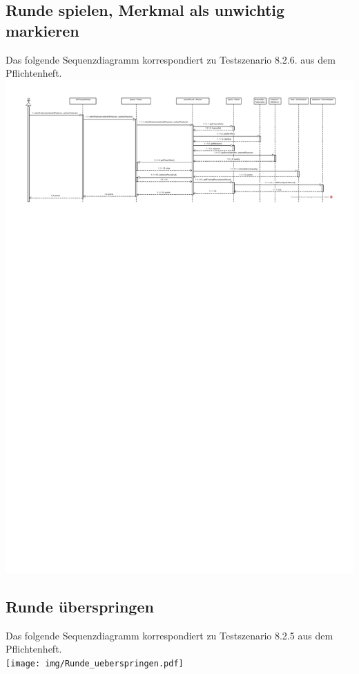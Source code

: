 \documentclass[a4paper]{scrreprt}
\begin{document}
	\subsection{Runde spielen, Merkmal als unwichtig markieren}
	Das folgende Sequenzdiagramm korrespondiert zu Testszenario 8.2.6. aus dem Pflichtenheft. \\
	\includegraphics[width=\textwidth]{img/Runde_spielen.pdf}

	\subsection{Runde überspringen}
	Das folgende Sequenzdiagramm korrespondiert zu Testszenario 8.2.5 aus dem Pflichtenheft. \\
	\texttt{[image: img/Runde\_ueberspringen.pdf]}
\end{document}
